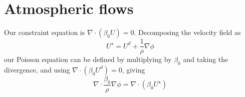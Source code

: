 \section{Atmospheric flows}

Our constraint equation is $\nabla \cdot (\beta_0 U) = 0$.  Decomposing the velocity field
as 
\begin{equation}
U^\star = U^d + \frac{1}{\rho} \nabla \phi
\end{equation}
our Poisson equation can be defined by multiplying by $\beta_0$ and
taking the divergence, and using $\nabla \cdot (\beta_0 U^d) = 0$, giving
\begin{equation}
\nabla \cdot \frac{\beta_0}{\rho} \nabla \phi = \nabla \cdot (\beta_0 U^\star)
\end{equation}
